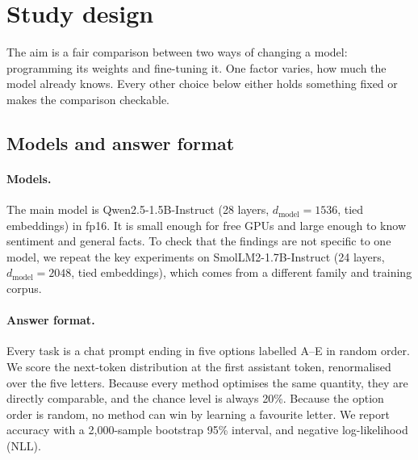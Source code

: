 \section{Study design}
\label{sec:design}

The aim is a fair comparison between two ways of changing a model: programming its weights and fine-tuning it. One factor varies, how much the model already knows. Every other choice below either holds something fixed or makes the comparison checkable.

\subsection{Models and answer format}
\paragraph{Models.} The main model is Qwen2.5-1.5B-Instruct (28 layers, $d_\text{model}=1536$, tied embeddings) in fp16. It is small enough for free GPUs and large enough to know sentiment and general facts. To check that the findings are not specific to one model, we repeat the key experiments on SmolLM2-1.7B-Instruct (24 layers, $d_\text{model}=2048$, tied embeddings), which comes from a different family and training corpus.

\paragraph{Answer format.} Every task is a chat prompt ending in five options labelled A--E in random order. We score the next-token distribution at the first assistant token, renormalised over the five letters. Because every method optimises the same quantity, they are directly comparable, and the chance level is always 20\%. Because the option order is random, no method can win by learning a favourite letter. We report accuracy with a 2,000-sample bootstrap 95\% interval, and negative log-likelihood (NLL).

